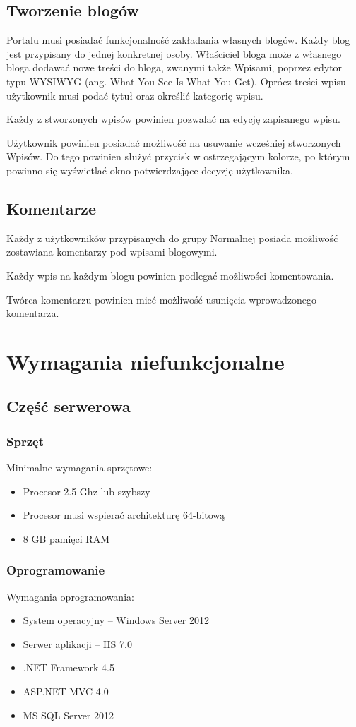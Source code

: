 \documentclass{article}
\begin{document}
\subsection{Tworzenie blogów}
Portalu musi posiadać funkcjonalność zakładania własnych blogów. Każdy blog jest przypisany do jednej konkretnej osoby. Właściciel bloga może z własnego bloga dodawać nowe treści do bloga, zwanymi także Wpisami, poprzez edytor typu WYSIWYG (ang. What You See Is What You Get). Oprócz treści wpisu użytkownik musi podać tytuł oraz określić kategorię wpisu.

Każdy z stworzonych wpisów powinien pozwalać na edycję zapisanego wpisu.

Użytkownik powinien posiadać możliwość na usuwanie wcześniej stworzonych Wpisów. Do tego powinien służyć przycisk w ostrzegającym kolorze, po którym powinno się wyświetlać okno potwierdzające decyzję użytkownika.

\subsection{Komentarze}
Każdy z użytkowników przypisanych do grupy Normalnej posiada możliwość zostawiana komentarzy pod wpisami blogowymi.

Każdy wpis na każdym blogu powinien podlegać możliwości komentowania.

Twórca komentarzu powinien mieć możliwość usunięcia wprowadzonego komentarza.

\section{Wymagania niefunkcjonalne}
\subsection{Część serwerowa}


\subsubsection{Sprzęt}
Minimalne wymagania sprzętowe:
\begin{itemize}
\item Procesor 2.5 Ghz lub szybszy
\item Procesor musi wspierać architekturę 64-bitową
\item 8 GB pamięci RAM
\end{itemize}

\subsubsection{Oprogramowanie}
Wymagania oprogramowania:
\begin{itemize}
\item System operacyjny -- Windows Server 2012 
\item Serwer aplikacji -- IIS 7.0
\item .NET Framework 4.5
\item ASP.NET MVC 4.0
\item MS SQL Server 2012
\end{itemize}
\end{document}
